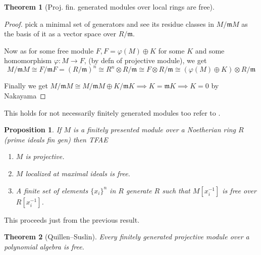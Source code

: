 \documentclass[12pt]{article}
\numberwithin{equation}{section}
\newtheorem{theorem}{Theorem}[section]
\newtheorem{proposition}{Proposition}[section]
\begin{document}
	\begin{theorem}[Proj. fin. generated modules over local rings are free]
	\end{theorem}
	\begin{proof}
			pick a minimal set of generators and see its residue classes in $M/\mathfrak{m}M$ as the basis of it as a vector space over $R/\mathfrak{m}$.
		
		Now as for some free module $F, F=\varphi(M)\oplus K$ for some $K$ and some homomorphism $\varphi: M \to F$, (by defn of projective module), 	we get \[ M/\mathfrak{m}M \cong 	F/\mathfrak{m}F = (R/\mathfrak{m})^n\cong R^n\otimes R/\mathfrak{m} \cong F \otimes R/\mathfrak{m} \cong (\varphi(M)\oplus K) \otimes R/\mathfrak{m}\]
		
		Finally we get $M/\mathfrak{m}M \cong M/\mathfrak{m}M \oplus K/\mathfrak{m}K\implies K=\mathfrak{m}K \implies K=0$ by Nakayama
	\end{proof}
	This holds for not necessarily finitely generated modules too refer to \cite[Th.~2.5]{matsumura_1987}	.
	\begin{proposition} If $M$ is a finitely presented module over a Noetherian ring $R$ (prime ideals fin gen) then TFAE
	\begin{enumerate}
		\item $M$ is projective.
		\item $M$ localized at maximal ideals is free.
		\item A finite set of elements $\{x_i\}^n$ in $R$ generate $R$ such that $M[x_i^{-1}]$ is free over $R[x_i^{-1}]$.
	\end{enumerate}		
	\end{proposition}
This proceeds just from the previous result.

%		
%		
	\begin{theorem}[Quillen–Suslin]
		Every finitely generated projective module over a polynomial algebra is free.
	\end{theorem}
	
\end{document}
